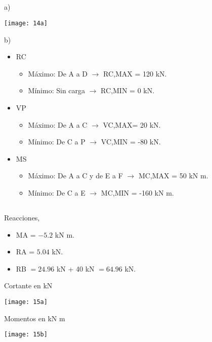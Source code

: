 \subsection{}
a)

	\begin{center}
		\texttt{[image: 14a]}
	\end{center}
b)
\begin{itemize}
\item RC
\begin{itemize}
	\item Máximo: De A a D $\rightarrow$ RC,MAX = 120 kN.
    \item Mínimo: Sin carga $\rightarrow$ RC,MIN = 0 kN.
    \end{itemize}
\item VP
\begin{itemize}
	\item Máximo: De A a C $\rightarrow$ VC,MAX= 20 kN.
    \item Mínimo: De C a P $\rightarrow$ VC,MIN = -80 kN.
    \end{itemize}
\item MS
\begin{itemize}
	\item Máximo: De A a C y de E a F $\rightarrow$ MC,MAX = 50 kN m.
   \item Mínimo: De C a E $\rightarrow$ MC,MIN = -160 kN m.
\end{itemize}
\end{itemize}



\subsection{}
%
Reacciones,
\begin{itemize}
\item MA = $-5.2$ kN m.
\item  RA = $5.04$ kN.
\item RB $= 24.96$ kN + 40 kN  $= 64.96$ kN.
\end{itemize}
%


Cortante en kN

\begin{center}
	\texttt{[image: 15a]}
\end{center}

Momentos en kN m
 
 \begin{center}
 	\texttt{[image: 15b]}
 \end{center}



